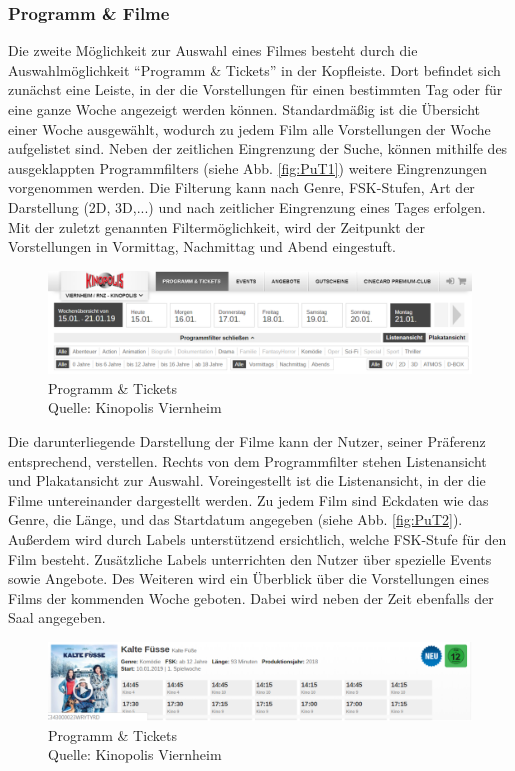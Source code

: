 	\subsubsection{Programm \& Filme}
	Die zweite Möglichkeit zur Auswahl eines Filmes besteht durch die Auswahlmöglichkeit \enquote{Programm \& Tickets} in der Kopfleiste. Dort befindet sich zunächst eine Leiste, in der die Vorstellungen für einen bestimmten Tag oder für eine ganze Woche angezeigt werden können. Standardmäßig ist die Übersicht einer Woche ausgewählt, wodurch zu jedem Film alle Vorstellungen der Woche aufgelistet sind. Neben der zeitlichen Eingrenzung der Suche, können mithilfe des ausgeklappten Programmfilters (siehe Abb. \vref{fig:PuT1}) weitere Eingrenzungen vorgenommen werden. Die Filterung kann nach Genre, FSK-Stufen, Art der Darstellung (2D, 3D,...) und nach zeitlicher Eingrenzung eines Tages erfolgen. Mit der zuletzt genannten Filtermöglichkeit, wird der Zeitpunkt der Vorstellungen in Vormittag, Nachmittag und Abend eingestuft.
	\begin{figure}[H]
		\centering 
		\includegraphics[width=14cm]{img/PuT_1.png}
		\captionsetup{format=hang}
		\centering\caption[Startseite von Kinopolis Viernheim]{\label{fig:PuT1}Programm \& Tickets \\Quelle: Kinopolis Viernheim}
	\end{figure}
	
	Die darunterliegende Darstellung der Filme kann der Nutzer, seiner Präferenz entsprechend, verstellen. Rechts von dem Programmfilter stehen Listenansicht und Plakatansicht zur Auswahl. Voreingestellt ist die Listenansicht, in der die Filme untereinander dargestellt werden. Zu jedem Film sind Eckdaten wie das Genre, die Länge, und das Startdatum angegeben (siehe Abb. \vref{fig:PuT2}). Außerdem wird durch Labels unterstützend ersichtlich, welche FSK-Stufe für den Film besteht. Zusätzliche Labels unterrichten den Nutzer über spezielle Events sowie Angebote. Des Weiteren wird ein Überblick über die Vorstellungen eines Films der kommenden Woche geboten. Dabei wird neben der Zeit ebenfalls der Saal angegeben. 
	\begin{figure}[H]
		\centering 
		\includegraphics[width=14cm]{img/PuT_2.png}
		\captionsetup{format=hang}
		\centering\caption[Programm \& Tickets]{\label{fig:PuT2}Programm \& Tickets \\Quelle: Kinopolis Viernheim}
	\end{figure}
	
